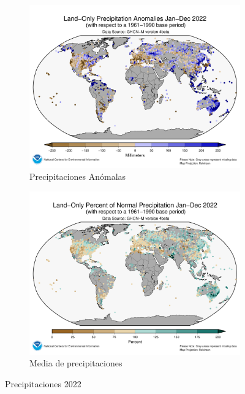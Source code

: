 \begin{figure} [H]
	\centering
	\begin{subfigure}{.5\textwidth}
		\centering
		\includegraphics[width=.9\linewidth]{fig/map-prcp-202201-202212.png}
		\caption{Precipitaciones Anómalas}
		\label{fig:sub1}
	\end{subfigure}%
	\begin{subfigure}{.5\textwidth}
		\centering
		\includegraphics[width=.9\linewidth]{fig/map-prcp-percent-202201-202212.png}
		\caption{Media de precipitaciones}
		\label{fig:sub2}
	\end{subfigure}
	\caption{Precipitaciones 2022}
	\label{fig:ej19}
\end{figure}


